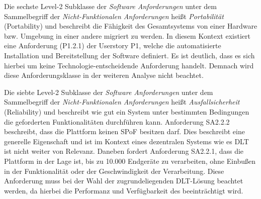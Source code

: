 Die sechste Level-2 Subklasse der \textit{Software Anforderungen} unter dem Sammelbegriff der \textit{Nicht-Funktionalen Anforderungen} heißt \textit{Portabilität} (Portability) und beschreibt die Fähigkeit des Gesamtsystems von einer Hardware bzw. Umgebung in einer andere migriert zu werden. In diesem Kontext existiert eine Anforderung (P1.2.1) der Userstory P1, welche die automatisierte Installation und Bereitstellung der Software definiert. Es ist deutlich, dass es sich hierbei um keine Technologie-entscheidende Anforderung handelt. Demnach wird diese Anforderungsklasse in der weiteren Analyse nicht beachtet.


Die siebte Level-2 Subklasse der \textit{Software Anforderungen} unter dem Sammelbegriff der \textit{Nicht-Funktionalen Anforderungen} heißt \textit{Ausfallsicherheit} (Reliability) und beschreibt wie gut ein System unter bestimmten Bedingungen die geforderten Funktionalitäten durchführen kann. Anforderung SA2.2.2 beschreibt, dass die Plattform keinen \ac{SPoF} besitzen darf. Dies beschreibt eine generelle Eigenschaft und ist im Kontext eines dezentralen Systems wie es \ac{DLT} ist nicht weiter von Relevanz. Daneben fordert Anforderung SA2.2.1, dass die Plattform in der Lage ist, bis zu 10.000 Endgeräte zu verarbeiten, ohne Einbußen in der Funktionalität oder der Geschwindigkeit der Verarbeitung. Diese Anforderung muss bei der Wahl der zugrundeliegenden \ac{DLT}-Lösung beachtet werden, da hierbei die Performanz und Verfügbarkeit des beeinträchtigt wird.


